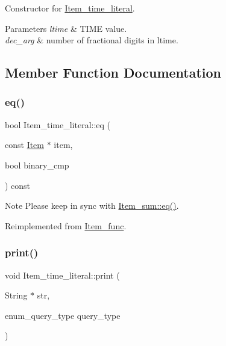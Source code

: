 Constructor for \mbox{\hyperlink{classItem__time__literal}{Item\+\_\+time\+\_\+literal}}. 
\begin{DoxyParams}{Parameters}
{\em ltime} & T\+I\+ME value. \\
\hline
{\em dec\+\_\+arg} & number of fractional digits in ltime. \\
\hline
\end{DoxyParams}


\subsection{Member Function Documentation}
\mbox{\label{classItem__time__literal_affc6ba040990919f39ee32d01bbf35c3}} 
\subsubsection{\texorpdfstring{eq()}{eq()}}
{\footnotesize\ttfamily bool Item\+\_\+time\+\_\+literal\+::eq (\begin{DoxyParamCaption}\item[{const \mbox{\hyperlink{classItem}{Item}} $\ast$}]{item,  }\item[{bool}]{binary\+\_\+cmp }\end{DoxyParamCaption}) const\hspace{0.3cm}{\ttfamily [virtual]}}

\begin{DoxyNote}{Note}
Please keep in sync with \mbox{\hyperlink{classItem__sum_aeab749252b834e0be4f00aac8ca523f5}{Item\+\_\+sum\+::eq()}}. 
\end{DoxyNote}


Reimplemented from \mbox{\hyperlink{classItem__func_a3de3f23377e6f0006dfccd375086365f}{Item\+\_\+func}}.

\mbox{\label{classItem__time__literal_a4e8dca3ff39e2a0ecd40373f083f9b14}} 
\subsubsection{\texorpdfstring{print()}{print()}}
{\footnotesize\ttfamily void Item\+\_\+time\+\_\+literal\+::print (\begin{DoxyParamCaption}\item[{String $\ast$}]{str,  }\item[{enum\+\_\+query\+\_\+type}]{query\+\_\+type }\end{DoxyParamCaption})\hspace{0.3cm}{\ttfamily [virtual]}}

